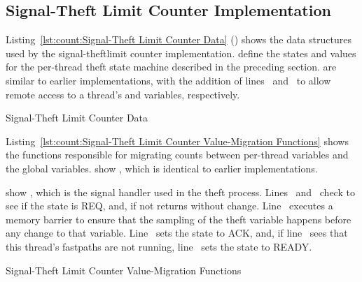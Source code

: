 \subsection{Signal-Theft Limit Counter Implementation}
\label{sec:count:Signal-Theft Limit Counter Implementation}

\begin{fcvref}
Listing~\ref{lst:count:Signal-Theft Limit Counter Data}
()
shows the data structures used by the 
{signal-theft}{limit counter}
implementation.
 define the states and values
for the per-thread theft state machine
described in the preceding section.
 are similar to earlier implementations,
with the addition of
lines~ and~ to allow remote access to a
thread's 
and  variables, respectively.
\end{fcvref}

\begin{listing}
\caption{Signal-Theft Limit Counter Data}
\label{lst:count:Signal-Theft Limit Counter Data}
\end{listing}

\begin{fcvref}
Listing~\ref{lst:count:Signal-Theft Limit Counter Value-Migration Functions}
shows the functions responsible for migrating counts between per-thread
variables and the global variables.
 show ,
which is identical to earlier
implementations.
\end{fcvref}
\begin{fcvref}
 show ,
which is the signal
handler used in the theft process.
Lines~ and~ check to see if
the  state is REQ, and, if not
returns without change.
Line~ executes a memory barrier to ensure that the sampling of the
theft variable happens before any change to that variable.
Line~ sets the  state to ACK, and, if
line~ sees that
this thread's fastpaths are not running, line~ sets the 
state to READY\@.
\end{fcvref}

\begin{listing}
\caption{Signal-Theft Limit Counter Value-Migration Functions}
\label{lst:count:Signal-Theft Limit Counter Value-Migration Functions}
\end{listing}

